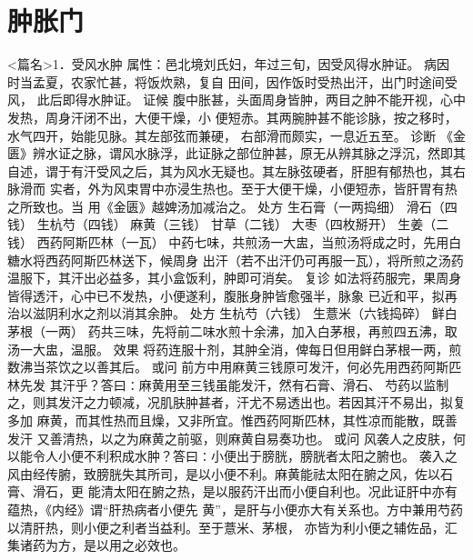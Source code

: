 \documentclass[a4paper,12pt,UTF8,twoside]{ctexbook}
\begin{document}
\chapter{肿胀门}
<篇名>1．受风水肿
属性：邑北境刘氏妇，年过三旬，因受风得水肿证。 
病因 时当孟夏，农家忙甚，将饭炊熟，复自 田间，因作饭时受热出汗，出门时途间受风， 
此后即得水肿证。 
证候 腹中胀甚，头面周身皆肿，两目之肿不能开视，心中发热，周身汗闭不出，大便干燥，小 
便短赤。其两腕肿甚不能诊脉，按之移时，水气四开，始能见脉。其左部弦而兼硬， 
右部滑而颇实，一息近五至。 
诊断 《金匮》辨水证之脉，谓风水脉浮，此证脉之部位肿甚，原无从辨其脉之浮沉，然即其 
自述，谓于有汗受风之后，其为风水无疑也。其左脉弦硬者，肝胆有郁热也，其右脉滑而 
实者，外为风束胃中亦浸生热也。至于大便干燥，小便短赤，皆肝胃有热之所致也。当 
用《金匮》越婢汤加减治之。 
处方 生石膏（一两捣细） 滑石（四钱） 生杭芍（四钱） 麻黄（三钱） 
甘草（二钱） 大枣（四枚掰开） 生姜（二钱） 西药阿斯匹林（一瓦） 
中药七味，共煎汤一大盅，当煎汤将成之时，先用白糖水将西药阿斯匹林送下，候周身 
出汗（若不出汗仍可再服一瓦），将所煎之汤药温服下，其汗出必益多，其小盒饭利，肿即可消矣。 
复诊 如法将药服完，果周身皆得透汗，心中已不发热，小便遂利，腹胀身肿皆愈强半，脉象 
已近和平，拟再治以滋阴利水之剂以消其余肿。 
处方 生杭芍（六钱） 生薏米（六钱捣碎） 鲜白茅根（一两） 
药共三味，先将前二味水煎十余沸，加入白茅根，再煎四五沸，取汤一大盅，温服。 
效果 将药连服十剂，其肿全消，俾每日但用鲜白茅根一两，煎数沸当茶饮之以善其后。 
或问 前方中用麻黄三钱原可发汗，何必先用西药阿斯匹林先发 
其汗乎？答曰∶麻黄用至三钱虽能发汗，然有石膏、滑石、 
芍药以监制之，则其发汗之力顿减，况肌肤肿甚者，汗尤不易透出也。若因其汗不易出，拟复多加 
麻黄，而其性热而且燥，又非所宜。惟西药阿斯匹林，其性凉而能散，既善发汗 
又善清热，以之为麻黄之前驱，则麻黄自易奏功也。 
或问 风袭人之皮肤，何以能令人小便不利积成水肿？答曰∶小便出于膀胱，膀胱者太阳之腑也。 
袭入之风由经传腑，致膀胱失其所司，是以小便不利。麻黄能祛太阳在腑之风，佐以石膏、滑石，更 
能清太阳在腑之热，是以服药汗出而小便自利也。况此证肝中亦有蕴热，《内经》谓“肝热病者小便先 
黄”，是肝与小便亦大有关系也。方中兼用芍药以清肝热，则小便之利者当益利。至于薏米、茅根， 
亦皆为利小便之辅佐品，汇集诸药为方，是以用之必效也。 
\end{document}
